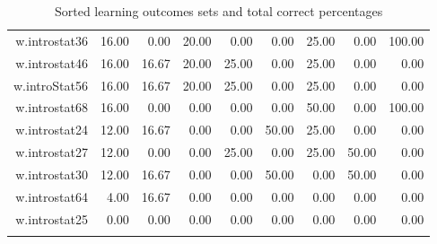 \documentclass[12pt,english,nohyper]{tufte-handout}\usepackage[]{graphicx}\usepackage[]{color}
\begin{document}
\begin{longtable}{rrrrrrrrr}
  w.introstat36 & 16.00 & 0.00 & 20.00 & 0.00 & 0.00 & 25.00 & 0.00 & 100.00 \\ 
  w.introstat46 & 16.00 & 16.67 & 20.00 & 25.00 & 0.00 & 25.00 & 0.00 & 0.00 \\ 
  w.introStat56 & 16.00 & 16.67 & 20.00 & 25.00 & 0.00 & 25.00 & 0.00 & 0.00 \\ 
  w.introstat68 & 16.00 & 0.00 & 0.00 & 0.00 & 0.00 & 50.00 & 0.00 & 100.00 \\ 
  w.introstat24 & 12.00 & 16.67 & 0.00 & 0.00 & 50.00 & 25.00 & 0.00 & 0.00 \\ 
  w.introstat27 & 12.00 & 0.00 & 0.00 & 25.00 & 0.00 & 25.00 & 50.00 & 0.00 \\ 
  w.introstat30 & 12.00 & 16.67 & 0.00 & 0.00 & 50.00 & 0.00 & 50.00 & 0.00 \\ 
  w.introstat64 & 4.00 & 16.67 & 0.00 & 0.00 & 0.00 & 0.00 & 0.00 & 0.00 \\ 
  w.introstat25 & 0.00 & 0.00 & 0.00 & 0.00 & 0.00 & 0.00 & 0.00 & 0.00 \\ 
   \hline
\hline
\caption{Sorted learning outcomes sets and total correct percentages} 
\label{tab:LearningObj_data}
\end{longtable}
\end{document}
